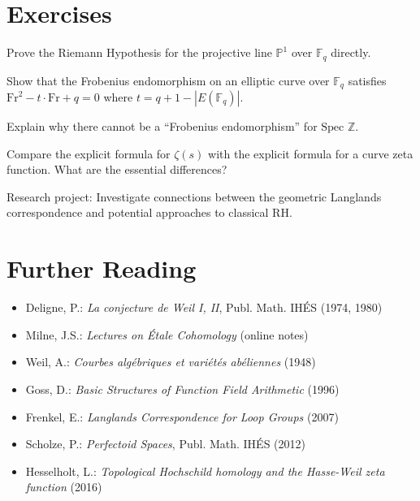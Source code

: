 \section{Exercises}

\begin{exercise}
Prove the Riemann Hypothesis for the projective line $\mathbb{P}^1$ over $\mathbb{F}_q$ directly.
\end{exercise}

\begin{exercise}
Show that the Frobenius endomorphism on an elliptic curve over $\mathbb{F}_q$ satisfies $\text{Fr}^2 - t\cdot\text{Fr} + q = 0$ where $t = q + 1 - |E(\mathbb{F}_q)|$.
\end{exercise}

\begin{exercise}
Explain why there cannot be a ``Frobenius endomorphism'' for $\text{Spec } \mathbb{Z}$.
\end{exercise}

\begin{exercise}
Compare the explicit formula for $\zeta(s)$ with the explicit formula for a curve zeta function. What are the essential differences?
\end{exercise}

\begin{exercise}
Research project: Investigate connections between the geometric Langlands correspondence and potential approaches to classical RH.
\end{exercise}

\section{Further Reading}

\begin{itemize}
\item Deligne, P.: \emph{La conjecture de Weil I, II}, Publ. Math. IHÉS (1974, 1980)
\item Milne, J.S.: \emph{Lectures on Étale Cohomology} (online notes)
\item Weil, A.: \emph{Courbes algébriques et variétés abéliennes} (1948)
\item Goss, D.: \emph{Basic Structures of Function Field Arithmetic} (1996)
\item Frenkel, E.: \emph{Langlands Correspondence for Loop Groups} (2007)
\item Scholze, P.: \emph{Perfectoid Spaces}, Publ. Math. IHÉS (2012)
\item Hesselholt, L.: \emph{Topological Hochschild homology and the Hasse-Weil zeta function} (2016)
\end{itemize}